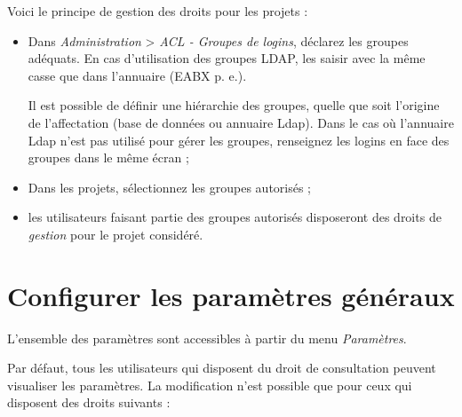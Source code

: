Voici le principe de gestion des droits pour les projets :
\begin{itemize}
\item Dans \textit{Administration} > \textit{ACL - Groupes de logins}, déclarez les groupes adéquats. En cas d'utilisation des groupes LDAP, les saisir avec la même casse que dans l'annuaire (EABX p. e.).

Il est possible de définir une hiérarchie des groupes, quelle que soit l'origine de l'affectation (base de données ou annuaire Ldap).
Dans le cas où l'annuaire Ldap n'est pas utilisé pour gérer les groupes, renseignez les logins en face des groupes dans le même écran ;
\item Dans les projets, sélectionnez les groupes autorisés ;
\item les utilisateurs faisant partie des groupes autorisés disposeront des droits de \textit{gestion} pour le projet considéré.
\end{itemize}

\section{Configurer les paramètres généraux}
\label{param}
L'ensemble des paramètres sont accessibles à partir du menu \textit{Paramètres}. 

Par défaut, tous les utilisateurs qui disposent du droit de consultation peuvent visualiser les paramètres. La modification n'est possible que pour ceux qui disposent des droits suivants :

